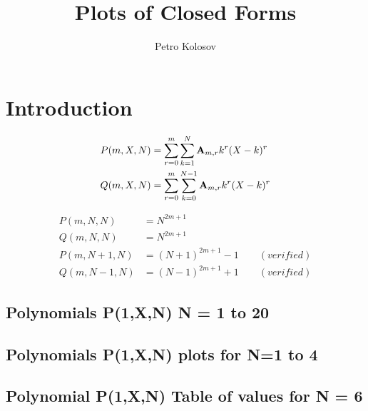 \documentclass[12pt,letterpaper,oneside,reqno]{amsart}
\title[Plots of Closed Forms]
{Plots of Closed Forms}
\author[Petro Kolosov]{Petro Kolosov}
\newcommand \coeffA [3][A] {{\mathbf{#1}} \sb{#2,#3}}
\newcommand \polynomialP [4][P]{{#1}(#2,#3,#4)}
\newcommand \polynomialQ [4][Q]{{#1}(#2,#3,#4)}
\begin{document}
%        

    \maketitle

    \tableofcontents


    \section{Introduction}\label{sec:introduction}
    \begin{align*}
        \polynomialP{m}{X}{N} &= \sum_{r=0}^{m} \sum_{k=1}^{N} \coeffA{m}{r} k^r (X-k)^r \\
        \polynomialQ{m}{X}{N} &= \sum_{r=0}^{m} \sum_{k=0}^{N-1} \coeffA{m}{r} k^r (X-k)^r
    \end{align*}

    \begin{align*}
        \polynomialP{m}{N}{N} &= N^{2m+1} \\
        \polynomialQ{m}{N}{N} &= N^{2m+1} \\
        \polynomialP{m}{N+1}{N} &= (N+1)^{2m+1} - 1 \quad \quad (verified) \\
        \polynomialQ{m}{N-1}{N} &= (N-1)^{2m+1} + 1 \quad \quad (verified)
    \end{align*}

    \subsection{Polynomials P(1,X,N) N = 1 to 20}
    

    \subsection{Polynomials P(1,X,N) plots for N=1 to 4}
    

    \subsection{Polynomial P(1,X,N) Table of values for N = 6}
    
\end{document}
